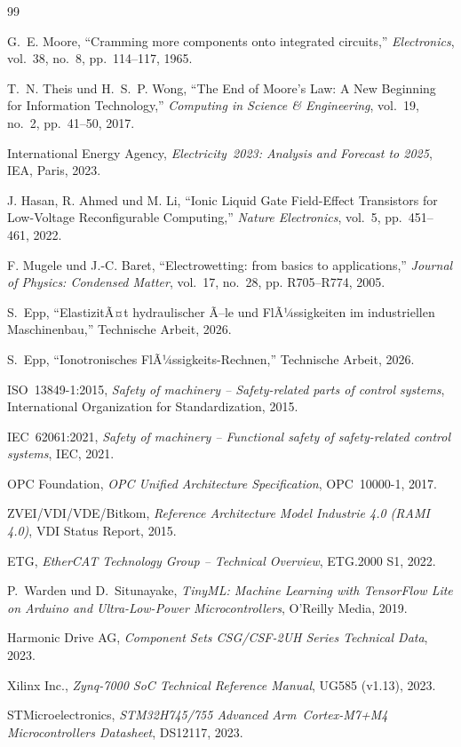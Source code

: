 ﻿\documentclass[a4paper,12pt]{scrreprt}
\theoremstyle{definition}
\begin{document}
\begin{thebibliography}{99}

G.~E. Moore, ``Cramming more components onto integrated circuits,''
\textit{Electronics}, vol.~38, no.~8, pp.~114--117, 1965.

T.~N. Theis und H.~S.~P. Wong, ``The End of Moore's Law: A New
Beginning for Information Technology,''
\textit{Computing in Science \& Engineering}, vol.~19, no.~2,
pp.~41--50, 2017.

International Energy Agency, \textit{Electricity~2023: Analysis and
Forecast to 2025}, IEA, Paris, 2023.

J. Hasan, R. Ahmed und M. Li, ``Ionic Liquid Gate Field-Effect
Transistors for Low-Voltage Reconfigurable Computing,''
\textit{Nature Electronics}, vol.~5, pp.~451--461, 2022.

F. Mugele und J.-C. Baret, ``Electrowetting: from basics to applications,''
\textit{Journal of Physics: Condensed Matter}, vol.~17, no.~28,
pp. R705--R774, 2005.

S.~Epp, ``ElastizitÃ¤t hydraulischer Ã–le und FlÃ¼ssigkeiten im
industriellen Maschinenbau,'' Technische Arbeit, 2026.

S.~Epp, ``Ionotronisches FlÃ¼ssigkeits-Rechnen,'' Technische Arbeit, 2026.

ISO~13849-1:2015, \textit{Safety of machinery -- Safety-related parts
of control systems}, International Organization for Standardization, 2015.

IEC~62061:2021, \textit{Safety of machinery -- Functional safety of
safety-related control systems}, IEC, 2021.

OPC Foundation, \textit{OPC Unified Architecture Specification},
OPC~10000-1, 2017.

ZVEI/VDI/VDE/Bitkom, \textit{Reference Architecture Model Industrie
4.0 (RAMI 4.0)}, VDI Status Report, 2015.

ETG, \textit{EtherCAT Technology Group -- Technical Overview},
ETG.2000 S1, 2022.

P.~Warden und D.~Situnayake, \textit{TinyML: Machine Learning with
TensorFlow Lite on Arduino and Ultra-Low-Power Microcontrollers},
O'Reilly Media, 2019.

Harmonic Drive AG, \textit{Component Sets CSG/CSF-2UH Series
Technical Data}, 2023.

Xilinx Inc., \textit{Zynq-7000 SoC Technical Reference Manual},
UG585 (v1.13), 2023.

STMicroelectronics, \textit{STM32H745/755 Advanced Arm\textregistered\
Cortex\textregistered-M7+M4 Microcontrollers Datasheet}, DS12117, 2023.

\end{thebibliography}
\end{document}
